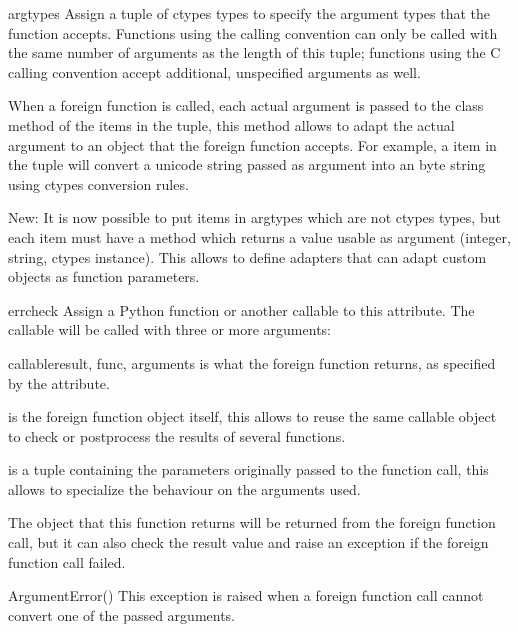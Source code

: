 \begin{memberdesc}{argtypes}
Assign a tuple of ctypes types to specify the argument types that
the function accepts.  Functions using the  calling
convention can only be called with the same number of arguments as
the length of this tuple; functions using the C calling convention
accept additional, unspecified arguments as well.

When a foreign function is called, each actual argument is passed
to the  class method of the items in the
 tuple, this method allows to adapt the actual
argument to an object that the foreign function accepts.  For
example, a  item in the  tuple will
convert a unicode string passed as argument into an byte string
using ctypes conversion rules.

New: It is now possible to put items in argtypes which are not
ctypes types, but each item must have a  method
which returns a value usable as argument (integer, string, ctypes
instance).  This allows to define adapters that can adapt custom
objects as function parameters.
\end{memberdesc}

\begin{memberdesc}{errcheck}
Assign a Python function or another callable to this attribute.
The callable will be called with three or more arguments:
\end{memberdesc}

\begin{funcdescni}{callable}{result, func, arguments}
 is what the foreign function returns, as specified by the
 attribute.

 is the foreign function object itself, this allows to
reuse the same callable object to check or postprocess the results
of several functions.

 is a tuple containing the parameters originally
passed to the function call, this allows to specialize the
behaviour on the arguments used.

The object that this function returns will be returned from the
foreign function call, but it can also check the result value and
raise an exception if the foreign function call failed.
\end{funcdescni}

\begin{excdesc}{ArgumentError()}
This exception is raised when a foreign function call cannot
convert one of the passed arguments.
\end{excdesc}


